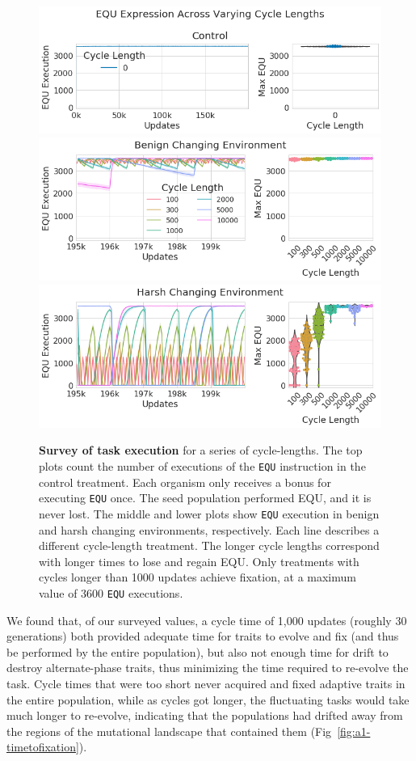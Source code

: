\documentclass[PhD]{msu-thesis}
\begin{document}
\begin{appendices}
\begin{figure}[!h]
	\includegraphics[width=0.85\columnwidth]{figures/A1/a1-taskexpression-control.png}
	\includegraphics[width=0.85\columnwidth]{figures/A1/a1-taskexpression-benign.png}
	\includegraphics[width=0.85\columnwidth]{figures/A1/a1-taskexpression-harsh.png}
	\caption{\textbf{Survey of task execution} for a series of cycle-lengths. The top plots count the number of executions of the \texttt{EQU} instruction in the control treatment. Each organism only receives a bonus for executing \texttt{EQU} once. The seed population performed EQU, and it is never lost. The middle and lower plots show \texttt{EQU} execution in benign and harsh changing environments, respectively. Each line describes a different cycle-length treatment. The longer cycle lengths correspond with longer times to lose and regain EQU. Only treatments with cycles longer than 1000 updates achieve fixation, at a maximum value of 3600 \texttt{EQU} executions. %
	}
	\label{fig:a1-taskexpression}
	\end{figure}

We found that, of our surveyed values, a cycle time of 1,000 updates (roughly 30 generations) both provided adequate time for traits to evolve and fix (and thus be performed by the entire population), but also not enough time for drift to destroy alternate-phase traits, thus minimizing the time required to re-evolve the task. Cycle times that were too short never acquired and fixed adaptive traits in the entire population, while as cycles got longer, the fluctuating tasks would take much longer to re-evolve, indicating that the populations had drifted away from the regions of the mutational landscape that contained them (Fig~\ref{fig:a1-timetofixation}). 


\end{appendices}
\end{document}

